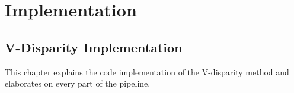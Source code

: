 
\chapter{Implementation}
\label{chp:Implementation}


\section{V-Disparity Implementation}
\label{vdisp_impl}
This chapter explains the code implementation of the V-disparity method and elaborates on every part of the pipeline.